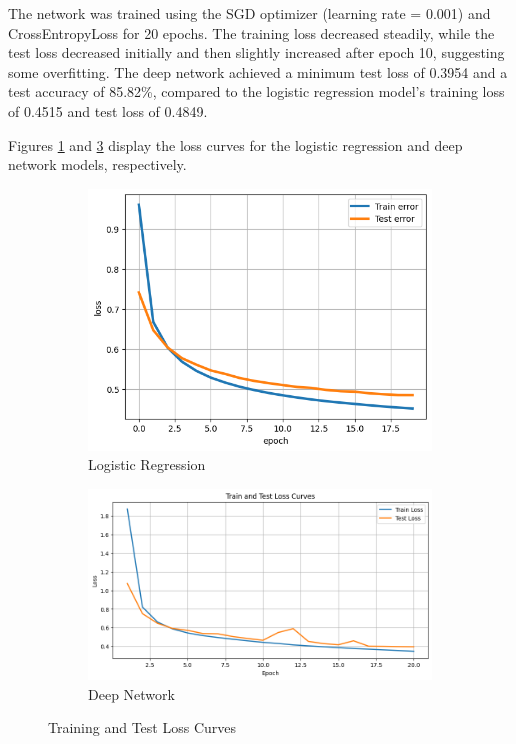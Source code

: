 \documentclass{article}
\begin{document}
The network was trained using the SGD optimizer (learning rate = 0.001) and CrossEntropyLoss for 20 epochs. The training loss decreased steadily, while the test loss decreased initially and then slightly increased after epoch 10, suggesting some overfitting. The deep network achieved a minimum test loss of 0.3954 and a test accuracy of 85.82\%, compared to the logistic regression model’s training loss of 0.4515 and test loss of 0.4849.

Figures \ref{fig:loss_1} and \ref{fig:loss} display the loss curves for the logistic regression and deep network models, respectively.

\begin{figure}[h!]
    \centering
    \begin{subfigure}[b]{0.45\textwidth}
        \includegraphics[width=\textwidth]{loss_1.png}
        \caption{Logistic Regression}
        \label{fig:loss_1}
    \end{subfigure}
    \begin{subfigure}[b]{0.45\textwidth}
        \includegraphics[width=\textwidth]{loss.png}
        \caption{Deep Network}
        \label{fig:loss}
    \end{subfigure}
    \caption{Training and Test Loss Curves}
\end{figure}
\end{document}
